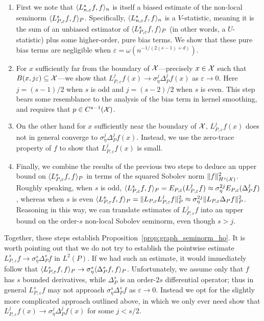 \begin{enumerate}
	\item First we note that $\langle L_{n,\varepsilon}^s f, f \rangle_n$ is itself a biased estimate of the non-local seminorm $\langle L_{P,\varepsilon}^sf, f \rangle_{P}$. Specifically, $\langle L_{n,\varepsilon}^s f, f \rangle_n$ is a $V$-statistic, meaning it is the sum of an unbiased estimator of $\langle L_{P,\varepsilon}^sf, f \rangle_{P}$ (in other words, a $U$-statistic) plus some higher-order, pure bias terms. We show that these pure bias terms are negligible when $\varepsilon = \omega(n^{-1/(2(s - 1) + d)})$. 
	\item For $x$ sufficiently far from the boundary of $\mathcal{X}$---precisely $x \in \mathcal{X}$ such that $B(x,j\varepsilon) \subseteq \mathcal{X}$---we show that $L_{P,\varepsilon}^jf(x) \to \sigma_{\eta}^j \Delta_P^jf(x)$ as $\varepsilon \to 0$. Here $j = (s - 1)/2$ when $s$ is odd and $j = (s - 2)/2$ when $s$ is even. This step bears some resemblance to the analysis of the bias term in kernel smoothing, and requires that $p \in C^{s-1}(\mathcal{X})$.
	\item On the other hand for $x$ sufficiently near the boundary of $\mathcal{X}$, $L_{P,\varepsilon}^jf(x)$ does not in general converge to $\sigma_{\eta}^j\Delta_P^jf(x)$. Instead, we use the zero-trace property of $f$ to show that $L_{P,\varepsilon}^jf(x)$ is small.
	\item Finally, we combine the results of the previous two steps to deduce an upper bound on $\langle L_{P,\varepsilon}^sf, f \rangle_{P}$ in terms of the squared Sobolev norm $\|f\|_{H^s(\mathcal{X})}^2$.  Roughly speaking, when $s$ is odd, $\langle L_{P,\varepsilon}^sf, f \rangle_P = E_{P,\varepsilon}(L_{P,\varepsilon}^jf) \approx \sigma_{\eta}^{2j}E_{P,\varepsilon}(\Delta_P^jf)$, whereas when $s$ is even $\langle L_{P,\varepsilon}^sf, f \rangle_P = \|L_{P,\varepsilon}L_{P,\varepsilon}^{j}f\|_{P}^2 \approx \sigma_{\eta}^{2j}\|L_{P,\varepsilon} \Delta_Pf\|_P^2$. Reasoning in this way, we can translate estimates of $L_{P,\varepsilon}^jf$ into an upper bound on the order-$s$ non-local Sobolev seminorm, even though $s > j$.
\end{enumerate}
Together, these steps establish Proposition~\ref{prop:graph_seminorm_ho}. It is worth pointing out that we do not try to establish the pointwise estimate $L_{P,\varepsilon}^sf \to \sigma_{\eta}^s\Delta_{P}^sf$ in $L^2(P)$. If we had such an estimate, it would immediately follow that $\langle L_{P,\varepsilon}^sf, f \rangle_{P} \to \sigma_{\eta}^s\langle \Delta_P^sf, f \rangle_{P}$. Unfortunately, we assume only that $f$ has $s$ bounded derivatives, while $\Delta_P^s$ is an order-$2s$ differential operator; thus in general $L_{P,\varepsilon}^sf$ may not approach $\sigma_{\eta}^s\Delta_{P}^sf$ as $\varepsilon \to 0$. Instead we opt for the slightly more complicated approach outlined above, in which we only ever need show that $L_{P,\varepsilon}^jf(x) \to \sigma_{\eta}^j \Delta_P^jf(x)$ for some $j < s/2$. 


